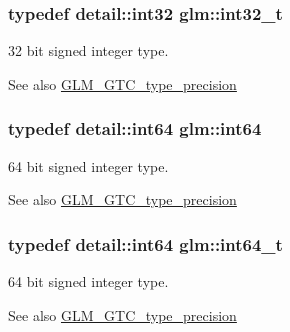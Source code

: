 \subsubsection[{\texorpdfstring{int32\+\_\+t}{int32_t}}]{\setlength{\rightskip}{0pt plus 5cm}typedef detail\+::int32 {\bf glm\+::int32\+\_\+t}}\hypertarget{group__gtc__type__precision_gab870c0eb6f525b0c8c4716762e0fc3a8}{}\label{group__gtc__type__precision_gab870c0eb6f525b0c8c4716762e0fc3a8}
32 bit signed integer type. \begin{DoxySeeAlso}{See also}
\hyperlink{group__gtc__type__precision}{G\+L\+M\+\_\+\+G\+T\+C\+\_\+type\+\_\+precision} 
\end{DoxySeeAlso}
\subsubsection[{\texorpdfstring{int64}{int64}}]{\setlength{\rightskip}{0pt plus 5cm}typedef detail\+::int64 {\bf glm\+::int64}}\hypertarget{group__gtc__type__precision_ga435d75819cce297cc5fa21bd84ef89a5}{}\label{group__gtc__type__precision_ga435d75819cce297cc5fa21bd84ef89a5}
64 bit signed integer type. \begin{DoxySeeAlso}{See also}
\hyperlink{group__gtc__type__precision}{G\+L\+M\+\_\+\+G\+T\+C\+\_\+type\+\_\+precision} 
\end{DoxySeeAlso}
\subsubsection[{\texorpdfstring{int64\+\_\+t}{int64_t}}]{\setlength{\rightskip}{0pt plus 5cm}typedef detail\+::int64 {\bf glm\+::int64\+\_\+t}}\hypertarget{group__gtc__type__precision_ga6abb23fbf4e39c50ec5341160b5da5ab}{}\label{group__gtc__type__precision_ga6abb23fbf4e39c50ec5341160b5da5ab}
64 bit signed integer type. \begin{DoxySeeAlso}{See also}
\hyperlink{group__gtc__type__precision}{G\+L\+M\+\_\+\+G\+T\+C\+\_\+type\+\_\+precision} 
\end{DoxySeeAlso}

